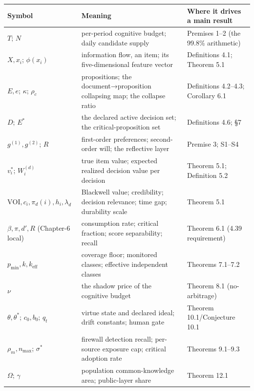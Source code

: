 \documentclass[
  11pt]{article}
\begin{document}
\begin{longtable}[]{@{}
  >{\raggedright\arraybackslash}p{}
  >{\raggedright\arraybackslash}p{}
  >{\raggedright\arraybackslash}p{}@{}}
\toprule\noalign{}
\begin{minipage}[b]{\linewidth}\raggedright
Symbol
\end{minipage} & \begin{minipage}[b]{\linewidth}\raggedright
Meaning
\end{minipage} & \begin{minipage}[b]{\linewidth}\raggedright
Where it drives a main result
\end{minipage} \\
\midrule\noalign{}
\endhead
\bottomrule\noalign{}
\endlastfoot
\(T\); \(N\) & per-period cognitive budget; daily candidate supply &
Premises 1--2 (the 99.8\% arithmetic) \\
\(X, x_i\); \(\phi(x_i)\) & information flow, an item; its
five-dimensional feature vector & Definitions 4.1; Theorem 5.1 \\
\(E, e\); \(\kappa\); \(\rho_c\) & propositions; the
document→proposition collapsing map; the collapse ratio & Definitions
4.2--4.3; Corollary 6.1 \\
\(D\); \(E^*\) & the declared active decision set; the
critical-proposition set & Definitions 4.6; §7 \\
\(g^{(1)}, g^{(2)}\); \(R\) & first-order preferences; second-order
will; the reflective layer & Premise 3; S1--S4 \\
\(v_i^*\); \(W_i^{(d)}\) & true item value; expected realized decision
value per decision & Theorem 5.1; Definition 5.2 \\
\(\mathrm{VOI}, c_i, \pi_d(i), h_i, \lambda_d\) & Blackwell value;
credibility; decision relevance; time gap; durability scale & Theorem
5.1 \\
\(\beta, \pi, d', R\) (Chapter-6 local) & consumption rate; critical
fraction; score separability; recall & Theorem 6.1 (4.39 requirement) \\
\(p_{\min}, k, k_{\mathrm{eff}}\) & coverage floor; monitored classes;
effective independent classes & Theorems 7.1--7.2 \\
\(\nu\) & the shadow price of the cognitive budget & Theorem 8.1
(no-arbitrage) \\
\(\theta, \theta^*\); \(c_0, b_0\); \(q_t\) & virtue state and declared
ideal; drift constants; human gate & Theorem 10.1/Conjecture 10.1 \\
\(\rho_m, n_{\max}\); \(\sigma^*\) & firewall detection recall;
per-source exposure cap; critical adoption rate & Theorems 9.1--9.3 \\
\(\Omega\); \(\gamma\) & population common-knowledge area; public-layer
share & Theorem 12.1 \\
\end{longtable}
\end{document}
